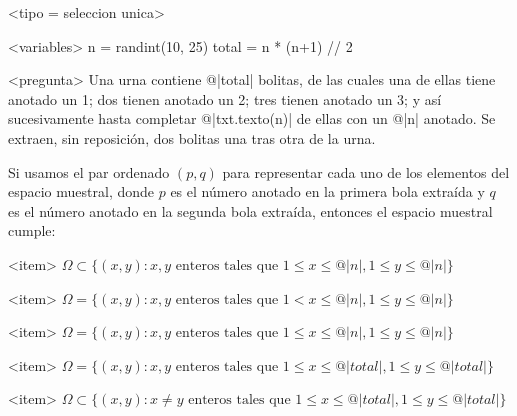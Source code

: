 <tipo = seleccion unica>

<variables>
n = randint(10, 25)
total = n * (n+1) // 2

<pregunta>
Una urna contiene @|total| bolitas, de las cuales una de ellas tiene anotado un 1; dos tienen anotado un 2; tres tienen anotado un 3; y así sucesivamente hasta completar @|txt.texto(n)| de ellas con un @|n| anotado. Se extraen, sin reposici\'on, dos bolitas una tras otra de la urna. \smallskip

Si usamos el par ordenado $(p, q)$ para representar cada uno de los elementos del espacio muestral, donde $p$ es el número anotado en la primera bola extraída y $q$ es el número anotado en la segunda bola extraída, entonces el espacio muestral cumple:

<item>
$\Omega \subset \{(x,y):  x,y \text{ enteros  tales que } 1\leq x \leq @|n|, 1\leq y \leq @|n|\}$

<item>
$\Omega = \{(x,y):  x,y \text{ enteros tales que } 1 < x \leq @|n|, 1\leq y \leq @|n|\}$

<item>
$\Omega = \{(x,y):  x,y \text{ enteros tales que } 1\leq x \leq @|n|, 1\leq y \leq  @|n|\}$

<item>
$\Omega =  \{(x,y):  x,y \text{ enteros tales que } 1\leq x \leq @|total|, 1\leq y \leq  @|total|\}$

<item>
$\Omega \subset \{(x,y):  x\neq y \text{ enteros tales que } 1\leq x \leq @|total|, 1\leq y \leq @|total|\}$
